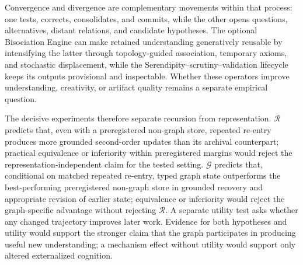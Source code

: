 Convergence and divergence are complementary movements within that process: one tests, corrects, consolidates, and commits, while the other opens questions, alternatives, distant relations, and candidate hypotheses. The optional Bisociation Engine can make retained understanding generatively reusable by intensifying the latter through topology-guided association, temporary axioms, and stochastic displacement, while the Serendipity--scrutiny--validation lifecycle keeps its outputs provisional and inspectable. Whether these operators improve understanding, creativity, or artifact quality remains a separate empirical question.

The decisive experiments therefore separate recursion from representation. $\mathcal{R}$ predicts that, even with a preregistered non-graph store, repeated re-entry produces more grounded second-order updates than its archival counterpart; practical equivalence or inferiority within preregistered margins would reject the representation-independent claim for the tested setting. $\mathcal{G}$ predicts that, conditional on matched repeated re-entry, typed graph state outperforms the best-performing preregistered non-graph store in grounded recovery and appropriate revision of earlier state; equivalence or inferiority would reject the graph-specific advantage without rejecting $\mathcal{R}$. A separate utility test asks whether any changed trajectory improves later work. Evidence for both hypotheses and utility would support the stronger claim that the graph participates in producing useful new understanding; a mechanism effect without utility would support only altered externalized cognition.

